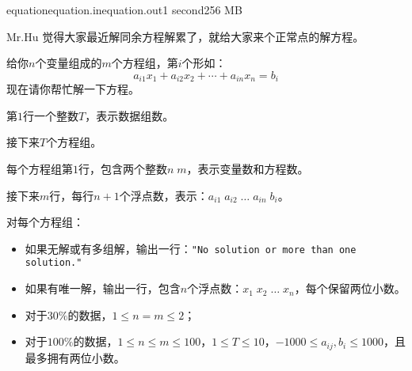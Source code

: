\documentclass[11pt,a4paper,oneside]{article}
\begin{document}
\begin{problem}{equation}{equation.in}{equation.out}{1 second}{256 MB}
	
	Mr.Hu 觉得大家最近解同余方程解累了，就给大家来个正常点的解方程。
	
	给你$n$个变量组成的$m$个方程组，第$i$个形如：
	$$
		a_{i1}x_1 + a_{i2}x_2 + \cdots + a_{in}x_n = b_i
	$$
	现在请你帮忙解一下方程。

	\InputFile
	
	第$1$行一个整数$T$，表示数据组数。
	
	接下来$T$个方程组。
	
	每个方程组第$1$行，包含两个整数$n \; m$，表示变量数和方程数。
	
	接下来$m$行，每行$n+1$个浮点数，表示：$a_{i1} \; a_{i2} \; \dots \; a_{in} \; b_i$。

	\OutputFile
	
	对每个方程组：
	\begin{itemize}
		\item 如果无解或有多组解，输出一行：\verb|"No solution or more than one solution."|
		\item 如果有唯一解，输出一行，包含$n$个浮点数：$x_1 \; x_2 \; \dots \; x_n$，每个保留两位小数。
	\end{itemize}
	
	\Example
	
	\begin{example}
	\end{example}
	
	\Note
	\begin{itemize}
		\item 对于$30\%$的数据，$1 \leq n = m \leq 2$；
		\item 对于$100\%$的数据，$1 \leq n \leq m \leq 100$，$1 \leq T \leq 10$，$-1000 \leq a_{ij}, b_i \leq 1000$，且最多拥有两位小数。
	\end{itemize}

\end{problem}
\end{document}
